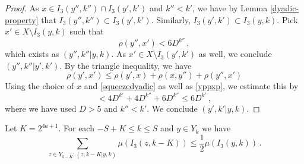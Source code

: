 \begin{proof}
As $x\in I_3(y'',k'')\cap I_3(y',k')$ and $k''< k'$, we have by Lemma \ref{dyadic-property} that
$I_3(y'',k'')\subset I_3(y',k')$. Similarly,
$I_3(y',k')\subset I_3(y,k)$.
Pick $x'\in X\setminus I_3(y,k)$ such that
\begin{equation}\label{yppxp}
    \rho(y'',x')< 6D^{k''}\, ,
\end{equation}
which exists as $(y'',k''|y,k)$. As
$x'\in X\setminus I_3(y',k')$ as well, we conclude
$(y'',k''| y',k')$.
By the triangle inequality, we have
\begin{equation}
\rho(y',x')\le  \rho(y',x)+\rho(x,y'')+\rho(y'',x')
\end{equation}
Using the choice of $x$ and \eqref{squeezedyadic}
as well as \eqref{yppxp}, we estimate this by
\begin{equation}
<  4D^{k'}+4D^{k''}+6D^{k''}\le 6D^{k'}\, ,
\end{equation}
where we have used $D>5$ and $k''<k'$.
We conclude $(y',k'|y,k)$.
\end{proof}


\begin{lemma}
\label{small-boundary}
 Let $K = 2^{4a+1}$. For each $-S+K\le k\le S$ and $y\in Y_k$ we have
    \begin{equation}
        \label{new-small-boundary}
        \sum_{z\in Y_{k-K}: (z,k-K|y,k)}\mu(I_3(z,k-K)) \le \frac 12 \mu(I_3(y,k))\,.
    \end{equation}
\end{lemma}

